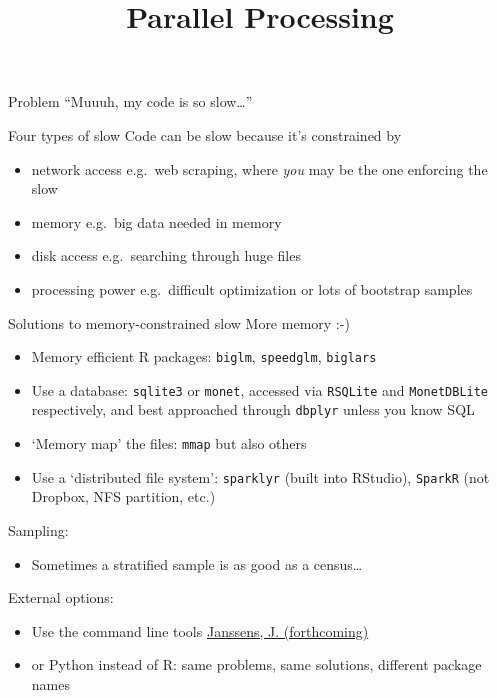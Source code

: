 \documentclass{hertieteaching}
\title{Parallel Processing}
\begin{document}
\maketitle


\begin{frame}{Problem}
\protect\hypertarget{problem}{}
``Muuuh, my code is so slow\ldots{}''
\end{frame}

\begin{frame}{Four types of slow}
\protect\hypertarget{four-types-of-slow}{}
Code can be slow because it's constrained by

\begin{itemize}

\item
  network access e.g.~web scraping, where \emph{you} may be the one
  enforcing the slow
\item
  memory e.g.~big data needed in memory
\item
  disk access e.g.~searching through huge files
\item
  processing power e.g.~difficult optimization or lots of bootstrap
  samples
\end{itemize}
\end{frame}

\begin{frame}[fragile]{Solutions to memory-constrained slow}
\protect\hypertarget{solutions-to-memory-constrained-slow}{}
More memory :-)

\pause

\begin{itemize}

\item
  Memory efficient R packages: \texttt{biglm}, \texttt{speedglm},
  \texttt{biglars}
\item
  Use a database: \texttt{sqlite3} or \texttt{monet}, accessed via
  \texttt{RSQLite} and \texttt{MonetDBLite} respectively, and best
  approached through \texttt{dbplyr} unless you know SQL
\item
  `Memory map' the files: \texttt{mmap} but also others
\item
  Use a `distributed file system': \texttt{sparklyr} (built into
  RStudio), \texttt{SparkR} (not Dropbox, NFS partition, etc.)
\end{itemize}

Sampling:
\begin{itemize}
  \item Sometimes a stratified sample is as good as a census\ldots
\end{itemize}

External options:
\begin{itemize}
  \item Use the command line tools \href{https://www.datascienceatthecommandline.com/2e/}{Janssens, J. (forthcoming)}
  \item or Python instead of R: same problems, same solutions, different package names
\end{itemize}




\end{frame}
\end{document}
